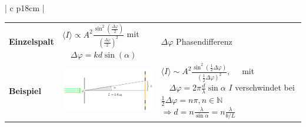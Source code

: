 \begin{tabular}{ | c   p{18cm} |}
\begin{tabular}{L{5cm} L{7cm} L{5cm}}
		\rowcolor[rgb]{1,1,1}
		\textbf{Einzelspalt} &
		$\displaystyle\langle I\rangle \propto A^{2} \frac{\sin ^{2}\left(\frac{\Delta \varphi}{2}\right)}{\left(\frac{\Delta \varphi}{2}\right)^{2}}$
		mit $\quad \Delta \varphi=k d \sin (\alpha)$ &$\Delta \varphi$ Phasendifferenz	 \\[10pt]
		
		
		\textbf{Beispiel}&\includegraphics[width=7cm]{spalt.png}& $\langle I\rangle \sim A^{2} \frac{\sin ^{2}\left(\frac{1}{2} \Delta \varphi\right)}{\left(\frac{1}{2} \Delta \varphi\right)^{2}}, \quad$ mit $\quad \Delta \varphi=2 \pi \frac{d}{\lambda} \sin \alpha$ $I$ verschwindet bei $\frac{1}{2} \Delta \varphi=n \pi, n \in \mathbb{N}$ \qquad $\Rightarrow d=n \frac{\lambda}{\sin \alpha}=n \frac{\lambda}{b/L}$\\
		
		
	
		
	\end{tabular}\\[5pt]
	\hline
\end{tabular}	
	
	

	

